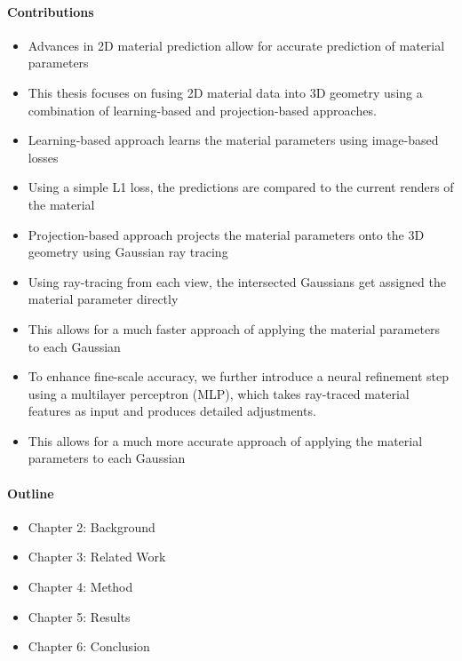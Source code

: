 \paragraph{Contributions}
\begin{itemize}
    \item Advances in 2D material prediction allow for accurate prediction of material parameters
    \item This thesis focuses on fusing 2D material data into 3D geometry using a combination of learning-based and projection-based approaches.
    \item Learning-based approach learns the material parameters using image-based losses
    \item Using a simple L1 loss, the predictions are compared to the current renders of the material
    \item Projection-based approach projects the material parameters onto the 3D geometry using Gaussian ray tracing
    \item Using ray-tracing from each view, the intersected Gaussians get assigned the material parameter directly
    \item This allows for a much faster approach of applying the material parameters to each Gaussian
    \item To enhance fine-scale accuracy, we further introduce a neural refinement step using a multilayer perceptron (MLP), which takes ray-traced material features as input and produces detailed adjustments.
    \item This allows for a much more accurate approach of applying the material parameters to each Gaussian
\end{itemize}

\paragraph{Outline}
\begin{itemize}
    \item Chapter 2: Background
    \item Chapter 3: Related Work
    \item Chapter 4: Method
    \item Chapter 5: Results
    \item Chapter 6: Conclusion
\end{itemize}



